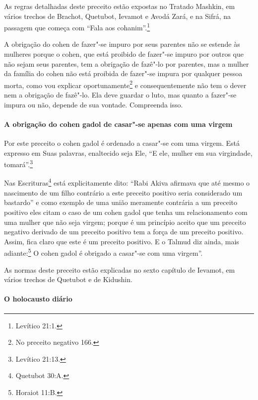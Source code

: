 \begin{multicols}{2}
As regras detalhadas deste preceito estão expostas no Tratado Mashkin\starr, em vários trechos de Brachot\starr, Quetubot\starr, Ievamot\starr{} e Avodá Zará\starr, e
na Sifrá\starr, na passagem que começa com ``Fala aos cohanim\starr''.\footnote{Levítico
21:1.}

A obrigação do cohen\starr{} de fazer"-se impuro por seus parentes não se
estende às mulheres porque o cohen\starr, que está proibido de fazer"-se
impuro por outros que não sejam seus parentes, tem a obrigação de
fazê"-lo por parentes, mas a mulher da família do cohen\starr{} não está proibida de
fazer"-se impura por qualquer pessoa morta, como vou explicar
oportunamente\footnote{No preceito negativo 166.} e consequentemente não tem o dever nem a obrigação de fazê"-lo. Ela deve guardar
o luto, mas quanto a fazer"-se impura ou não, depende de sua vontade.
Compreenda isso.

\paragraph{A obrigação do cohen gadol\starr{} de casar"-se apenas com uma virgem}

Por este preceito o cohen gadol\starr{} é ordenado a casar"-se com uma
virgem. Está expresso em Suas palavras, enaltecido seja Ele, ``E ele,
mulher em sua virgindade, tomará''.\footnote{Levítico 21:13.}

Nas Escrituras\footnote{Quetubot\starr{} 30:A.} está explicitamente dito: ``Rabi
Akiva\starr{} afirmava que até mesmo o nascimento de um filho contrário a este
preceito positivo seria considerado um bastardo'' e como exemplo de uma
união meramente contrária a um preceito positivo eles citam o caso de um
cohen gadol\starr{} que tenha um relacionamento com uma mulher que não seja
virgem; porque é um princípio aceito que um preceito negativo derivado
de um preceito positivo tem a força de um preceito positivo. Assim, fica
claro que este é um preceito positivo. E o Talmud\starr{} diz ainda, mais
adiante:\footnote{Horaiot\starr{} 11:B.} O cohen gadol\starr{} é obrigado a casar"-se com
uma virgem''.

As normas deste preceito estão explicadas no sexto capítulo de Ievamot\starr,
em vários trechos de Quetubot\starr{} e de Kidushin\starr.

\paragraph{O holocausto diário}


\end{multicols}
